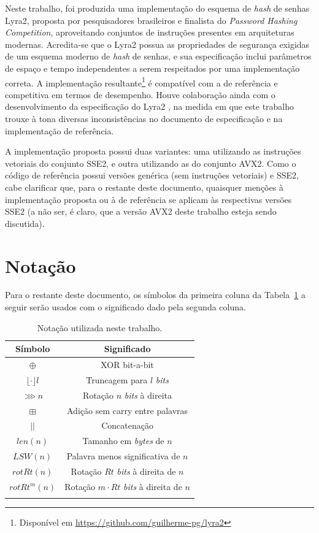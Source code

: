 \documentclass{article}
\begin{document}
Neste trabalho, foi produzida uma implementação do
esquema de \emph{hash} de senhas Lyra2, proposta por pesquisadores
brasileiros e finalista do \emph{Password Hashing Competition}, aproveitando
conjuntos de instruções presentes em arquiteturas modernas. Acredita-se
que o Lyra2 possua as propriedades de segurança exigidas de um esquema moderno
de \emph{hash} de senhas, e sua especificação inclui parâmetros de espaço e tempo
independentes a serem respeitados por uma implementação correta.
A implementação resultante\footnote{Disponível em \url{https://github.com/guilherme-pg/lyra2}}
é compatível com a de referência e competitiva em termos de desempenho. Houve colaboração
ainda com o desenvolvimento da especificação do Lyra2 \cite{lyra2-spec},
na medida em que este trabalho trouxe à tona diversas
inconsistências no documento de especificação e na implementação de referência.

A implementação proposta possui duas variantes: uma utilizando as instruções
vetoriais do conjunto SSE2, e outra utilizando as do conjunto AVX2. Como o
código de referência possui versões genérica (sem instruções vetoriais) e SSE2,
cabe clarificar que, para o restante deste documento, quaisquer menções à
implementação proposta ou à de referência se aplicam às respectivas versões
SSE2 (a não ser, é claro, que a versão AVX2 deste trabalho esteja sendo
discutida).

\section{Notação}

Para o restante deste documento, os símbolos da primeira coluna da
Tabela~\ref{tb:notation} a seguir serão usados com o significado dado pela segunda coluna.

\begingroup
\small
\begin{longtable}[c]{@{}cc@{}}
\toprule
Símbolo & Significado\tabularnewline
\midrule
\endhead
$\oplus$ & XOR bit-a-bit\tabularnewline
$\lfloor \cdot \rfloor l$ & Truncagem para $l$ \emph{bits}\tabularnewline
$\ggg n$ & Rotação $n$ \emph{bits} à direita\tabularnewline
$\boxplus$ & Adição sem carry entre palavras\tabularnewline
$||$ & Concatenação\tabularnewline
$len(n)$ & Tamanho em \emph{bytes} de $n$\tabularnewline
$LSW(n)$ & Palavra menos significativa de $n$\tabularnewline
$rotRt(n)$ & Rotação $Rt$ \emph{bits} à direita de $n$\tabularnewline
$rotRt^{m}(n)$ & Rotação $m \cdot Rt$ \emph{bits} à direita de
$n$\tabularnewline
\bottomrule
\caption{\label{tb:notation} Notação utilizada neste trabalho.}
\end{longtable}
\vspace{-1cm}
\endgroup
\end{document}
